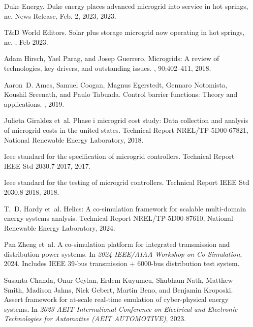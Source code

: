 \documentclass[12pt]{article}
\begin{document}
\begin{thebibliography}{10}
{Duke Energy}.
\newblock Duke energy places advanced microgrid into service in hot springs,
  nc.
\newblock News Release, Feb. 2, 2023, 2023.

{T\&D World Editors}.
\newblock Solar plus storage microgrid now operating in hot springs, nc.
, Feb 2023.

Adam Hirsch, Yael Parag, and Josep Guerrero.
\newblock Microgrids: A review of technologies, key drivers, and outstanding
  issues.
, 90:402--411, 2018.

Aaron~D. Ames, Samuel Coogan, Magnus Egerstedt, Gennaro Notomista, Koushil
  Sreenath, and Paulo Tabuada.
\newblock Control barrier functions: Theory and applications.
, 2019.

Julieta Giraldez et~al.
\newblock Phase i microgrid cost study: Data collection and analysis of
  microgrid costs in the united states.
\newblock Technical Report NREL/TP-5D00-67821, National Renewable Energy
  Laboratory, 2018.

Ieee standard for the specification of microgrid controllers.
\newblock Technical Report IEEE Std 2030.7-2017, 2017.

Ieee standard for the testing of microgrid controllers.
\newblock Technical Report IEEE Std 2030.8-2018, 2018.

T.~D. Hardy et~al.
\newblock Helics: A co-simulation framework for scalable multi-domain energy
  systems analysis.
\newblock Technical Report NREL/TP-5D00-87610, National Renewable Energy
  Laboratory, 2024.

Pan Zheng et~al.
\newblock A co-simulation platform for integrated transmission and distribution
  power systems.
\newblock In {\em 2024 IEEE/AIAA Workshop on Co-Simulation}, 2024.
\newblock Includes IEEE 39-bus transmission + 6000-bus distribution test
  system.

Susanta Chanda, Onur Ceylan, Erdem Kuyumcu, Shubham Nath, Matthew Smith,
  Madison Jahns, Nick Gebert, Martin Beno, and Benjamin Kroposki.
\newblock Assert framework for at-scale real-time emulation of cyber-physical
  energy systems.
\newblock In {\em 2023 AEIT International Conference on Electrical and
  Electronic Technologies for Automotive (AEIT AUTOMOTIVE)}, 2023.


\end{thebibliography}
\end{document}
